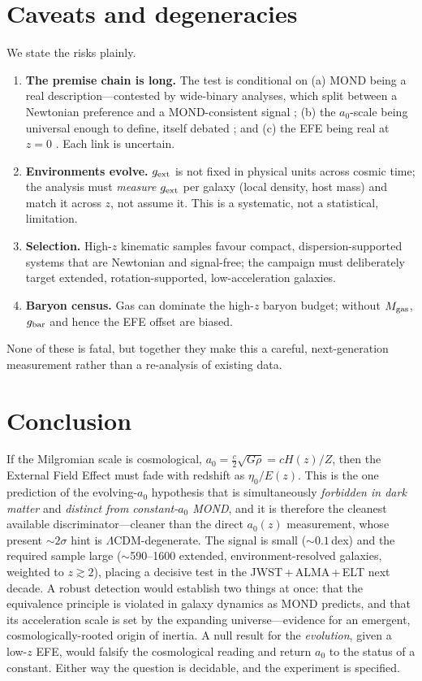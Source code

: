 \documentclass[11pt]{article}
\newcommand{\az}{a_0}
\newcommand{\gext}{g_{\rm ext}}
\newcommand{\gbar}{g_{\rm bar}}
\newcommand{\Ez}{E(z)}
\begin{document}
\section{Caveats and degeneracies}
We state the risks plainly.
\begin{enumerate}\itemsep1pt
\item \textbf{The premise chain is long.} The test is conditional on (a) MOND being a
real description---contested by wide-binary analyses, which split between a Newtonian
preference \cite{Banik2024} and a MOND-consistent signal \cite{Chae2023}; (b) the
$\az$-scale being universal enough to define, itself debated \cite{Rodrigues2018}; and
(c) the EFE being real at $z=0$ \cite{Chae2020}. Each link is uncertain.
\item \textbf{Environments evolve.} $\gext$ is not fixed in physical units across
cosmic time; the analysis must \emph{measure} $\gext$ per galaxy (local density, host
mass) and match it across $z$, not assume it. This is a systematic, not a statistical,
limitation.
\item \textbf{Selection.} High-$z$ kinematic samples favour compact,
dispersion-supported systems that are Newtonian and signal-free; the campaign must
deliberately target extended, rotation-supported, low-acceleration galaxies.
\item \textbf{Baryon census.} Gas can dominate the high-$z$ baryon budget; without
$M_{\rm gas}$, $\gbar$ and hence the EFE offset are biased.
\end{enumerate}
None of these is fatal, but together they make this a careful, next-generation
measurement rather than a re-analysis of existing data.

\section{Conclusion}
If the Milgromian scale is cosmological, $\az=\tfrac{c}{2}\sqrt{G\rho}=cH(z)/Z$, then
the External Field Effect must fade with redshift as $\eta_0/\Ez$. This is the one
prediction of the evolving-$\az$ hypothesis that is simultaneously \emph{forbidden in
dark matter} and \emph{distinct from constant-$\az$ MOND}, and it is therefore the
cleanest available discriminator---cleaner than the direct $\az(z)$ measurement, whose
present $\sim2\sigma$ hint is $\Lambda$CDM-degenerate. The signal is small
($\sim0.1$\,dex) and the required sample large ($\sim$590--1600 extended,
environment-resolved galaxies, weighted to $z\gtrsim2$), placing a decisive test in
the JWST\,+\,ALMA\,+\,ELT next decade. A robust detection would establish two things
at once: that the equivalence principle is violated in galaxy dynamics as MOND
predicts, and that its acceleration scale is set by the expanding universe---evidence
for an emergent, cosmologically-rooted origin of inertia. A null result for the
\emph{evolution}, given a low-$z$ EFE, would falsify the cosmological reading and
return $\az$ to the status of a constant. Either way the question is decidable, and
the experiment is specified.
\end{document}

